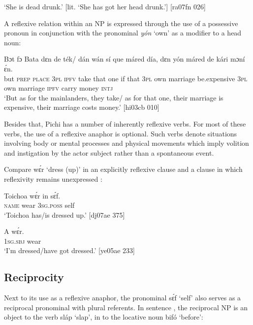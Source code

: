 \glt ‘She is dead drunk.’ [lit. ‘She has got her head drunk.’] [ra07fn 026]
\z

A reflexive relation within an \textsc{NP} is expressed through the use of a possessive pronoun in conjunction with the pronominal \textit{yón} ‘own’ as a modifier to a head noun: 


\ea%
    \label{ex:key:1229}
    \gll Bɔt  fɔ  Bata    dɛn  de  ték/    dán    wán  sí  que       máred
día,      dɛn    yón     máred    de  kári    mɔní  ɛ́n.\\
but  \textsc{prep}  \textsc{place}  \textsc{3pl}  \textsc{ipfv}  take    that    one  if  that  \textsc{3pl}  own  marriage
be.expensive  \textsc{3pl}    own    marriage    \textsc{ipfv}  carry  money  \textsc{intj}\\

\glt ‘But as for the mainlanders, they take/ as for that one, their marriage is 
expensive, their marriage costs money.’ [hi03cb 010]
\z

Besides that, Pichi has a number of inherently reflexive verbs. For most of these verbs, the use of a reflexive anaphor is optional. Such verbs denote situations involving body or mental processes and physical movements which imply volition and instigation by the actor subject rather than a spontaneous event. 


Compare wɛ́r ‘dress (up)’ in an explicitly reflexive clause  and a clause in which reflexivity remains unexpressed : 



\ea%
    \label{ex:key:1230}
    \gll Toichoa    wɛ́r    in    sɛ́f.\\
\textsc{name}    wear  \textsc{3sg.poss}  self\\

\glt ‘Toichoa has/is dressed up.’ [dj07ae 375]
\z


\ea%
    \label{ex:key:1231}
    \gll A    wɛ́r.\\
\textsc{1sg.sbj}  wear\\

\glt ‘I’m dressed/have got dressed.’ [ye05ae 233]
\z

\subsection{Reciprocity}\label{sec:9.3.6}

Next to its use as a reflexive anaphor, the pronominal sɛ́f ‘self’ also serves as a reciprocal pronominal with plural referents. In sentence , the reciprocal NP is an object to the verb sláp ‘slap’, in  to the locative noun bifó ‘before’:


